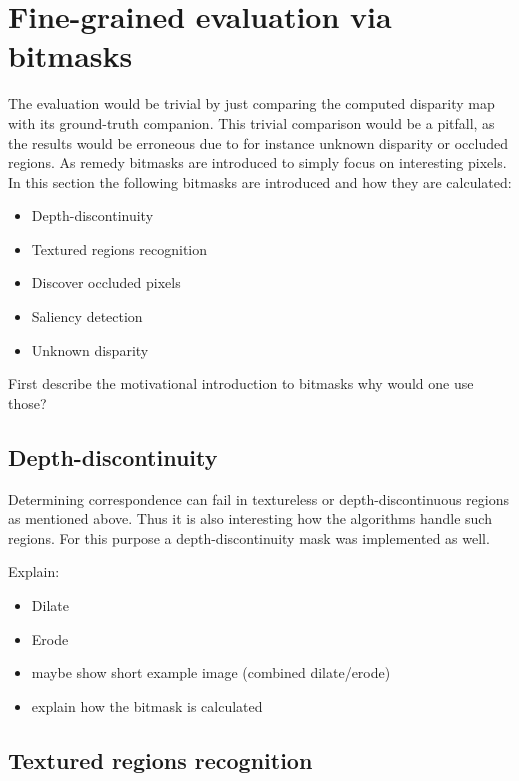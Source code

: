 \section{Fine-grained evaluation via bitmasks}

The evaluation would be trivial by just comparing the computed disparity map with its ground-truth companion.
This trivial comparison would be a pitfall, as the results would be erroneous due to for instance unknown disparity or occluded regions.
As remedy bitmasks are introduced to simply focus on interesting pixels.
In this section the following bitmasks are introduced and how they are calculated:

\begin{itemize}
  \item Depth-discontinuity
  \item Textured regions recognition
  \item Discover occluded pixels
  \item Saliency detection
  \item Unknown disparity
\end{itemize}

First describe the motivational introduction to bitmasks why would one use those?

\subsection*{Depth-discontinuity}

Determining correspondence can fail in textureless or depth-discontinuous regions as mentioned above.
Thus it is also interesting how the algorithms handle such regions. For this purpose a depth-discontinuity mask was implemented as well.

Explain:

\begin{itemize}
  \item Dilate
  \item Erode
  \item maybe show short example image (combined dilate/erode)
  \item explain how the bitmask is calculated
\end{itemize}

\subsection*{Textured regions recognition}


